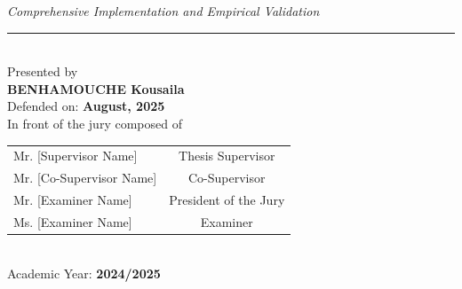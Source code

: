 \begin{center}
{\small \textit{Comprehensive Implementation and Empirical Validation}} \\[0.3cm]

\rule{13cm}{0.5pt} \\[0.4cm]

{\small Presented by} \\[0.15cm]
{\large \textbf{BENHAMOUCHE Kousaila}} \\[0.3cm]

{\small Defended on: \textbf{August, 2025}} \\[0.15cm]
{\small In front of the jury composed of} \\[0.3cm]

{\small
\begin{tabular}{lc}
Mr. [Supervisor Name] & Thesis Supervisor \\
Mr. [Co-Supervisor Name] & Co-Supervisor \\
Mr. [Examiner Name] & President of the Jury \\
Ms. [Examiner Name] & Examiner \\
\end{tabular}} \\[0.4cm]

{\small Academic Year: \textbf{2024/2025}}

\end{center}

\restoregeometry
\newpage